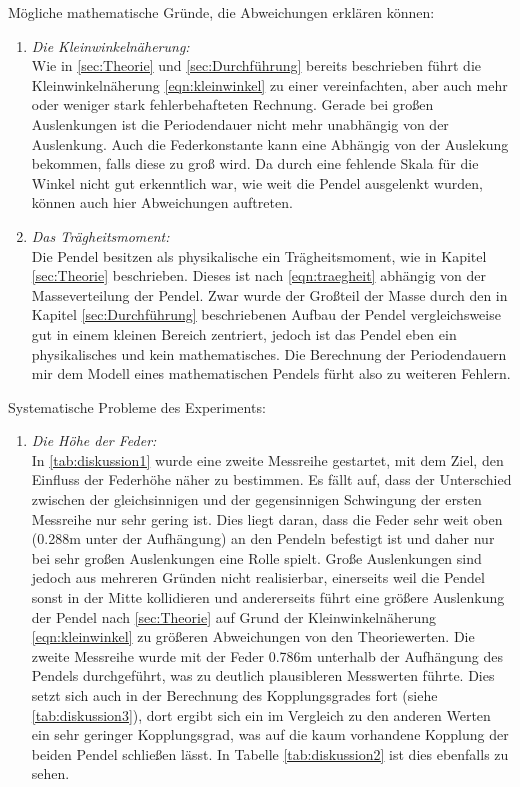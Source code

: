 Mögliche mathematische Gründe, die Abweichungen erklären können:
\begin{enumerate}
    \item \textit{Die Kleinwinkelnäherung:}\\
        Wie in \ref{sec:Theorie} und \ref{sec:Durchführung} bereits beschrieben führt die Kleinwinkelnäherung \eqref{eqn:kleinwinkel}
        zu einer vereinfachten, aber auch mehr oder weniger stark fehlerbehafteten Rechnung. Gerade bei großen Auslenkungen ist die
        Periodendauer nicht mehr unabhängig von der Auslenkung. Auch die Federkonstante kann eine Abhängig von
        der Auslekung bekommen, falls diese zu groß wird. Da durch eine fehlende Skala für die Winkel nicht gut erkenntlich war,
        wie weit die Pendel ausgelenkt wurden, können auch hier Abweichungen auftreten.
    \item \textit{Das Trägheitsmoment:}\\
        Die Pendel besitzen als physikalische ein Trägheitsmoment, wie in Kapitel \ref{sec:Theorie} beschrieben. Dieses ist nach
        \eqref{eqn:traegheit} abhängig von der Masseverteilung der Pendel. Zwar wurde der Großteil der Masse durch den in
        Kapitel \ref{sec:Durchführung} beschriebenen Aufbau der Pendel vergleichsweise gut in einem kleinen Bereich zentriert,
        jedoch ist das Pendel eben ein physikalisches und kein mathematisches. Die Berechnung der Periodendauern mir dem
        Modell eines mathematischen Pendels fürht also zu weiteren Fehlern.
\end{enumerate}
Systematische Probleme des Experiments:
\begin{enumerate}
    \item \textit{Die Höhe der Feder:} \\
    In \ref{tab:diskussion1} wurde eine zweite Messreihe gestartet, mit dem Ziel, den Einfluss der Federhöhe näher zu bestimmen.
    Es fällt auf, dass der Unterschied zwischen der gleichsinnigen und der gegensinnigen Schwingung der ersten Messreihe nur sehr gering ist.
    Dies liegt daran, dass die Feder sehr weit oben (0.288m unter der Aufhängung) an den Pendeln befestigt ist und daher nur bei sehr großen
    Auslenkungen eine Rolle spielt. Große Auslenkungen sind jedoch aus mehreren Gründen nicht realisierbar, einerseits weil die Pendel sonst
    in der Mitte kollidieren und andererseits führt eine größere Auslenkung der Pendel nach \ref{sec:Theorie} auf Grund der Kleinwinkelnäherung
    \eqref{eqn:kleinwinkel} zu größeren Abweichungen von den Theoriewerten. Die zweite Messreihe wurde mit der
    Feder 0.786m unterhalb der Aufhängung des Pendels durchgeführt, was zu
    deutlich plausibleren Messwerten führte. Dies setzt sich auch in der Berechnung des Kopplungsgrades fort (siehe \ref{tab:diskussion3}),
    dort ergibt sich ein im Vergleich zu den anderen Werten ein sehr geringer Kopplungsgrad, was auf die kaum vorhandene Kopplung der beiden Pendel schließen lässt.
    In Tabelle \ref{tab:diskussion2} ist dies ebenfalls zu sehen.
\end{enumerate}

